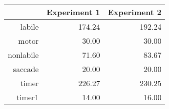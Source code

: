 \begin{table}[ht]
\centering
\begin{tabular}{rrr}
  \hline
 & Experiment 1 & Experiment 2 \\ 
  \hline
labile & 174.24 & 192.24 \\ 
  motor & 30.00 & 30.00 \\ 
  nonlabile & 71.60 & 83.67 \\ 
  saccade & 20.00 & 20.00 \\ 
  timer & 226.27 & 230.25 \\ 
  timer1 & 14.00 & 16.00 \\ 
   \hline
\end{tabular}
\end{table}

